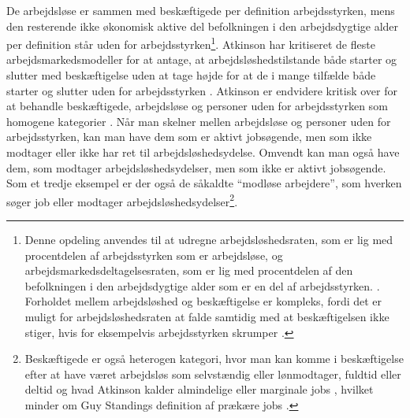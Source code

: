 De arbejdsløse er sammen med beskæftigede per definition arbejdsstyrken, mens den resterende ikke økonomisk aktive del  befolkningen i den arbejdsdygtige alder per definition står uden for arbejdsstyrken\footnote{Denne opdeling anvendes til at udregne arbejdsløshedsraten, som er lig med procentdelen af arbejdsstyrken som er arbejdsløse, og arbejdsmarkedsdeltagelsesraten, som er lig med procentdelen af den befolkningen i den arbejdsdygtige alder som er en del af arbejdsstyrken. \parencite[595]{Mankiw2011}. Forholdet mellem arbejdsløshed og beskæftigelse er kompleks, fordi det er muligt for arbejdsløshedsraten at falde samtidig med at beskæftigelsen ikke stiger, hvis for eksempelvis arbejdsstyrken skrumper \parencite[449]{Cahuc2004}.}. Atkinson har kritiseret de fleste arbejdsmarkedsmodeller for at antage, at arbejdsløshedstilstande både starter og slutter med beskæftigelse uden at tage højde for at de i mange tilfælde både starter og slutter uden for arbejdsstyrken \parencite[1683]{Atkinson1991}. Atkinson er endvidere kritisk over for at behandle beskæftigede, arbejdsløse og personer uden for arbejdsstyrken som homogene kategorier \parencite[1683]{Atkinson1991}. Når man skelner mellen arbejdsløse og personer uden for arbejdsstyrken, kan man have dem som er aktivt jobsøgende, men som ikke modtager eller ikke har ret til arbejdsløshedsydelse. Omvendt kan man også have dem, som modtager arbejdsløshedsydelser, men som ikke er aktivt jobsøgende. Som et tredje eksempel er der også de såkaldte “modløse arbejdere”, som hverken søger job eller modtager arbejdsløshedsydelser\footnote{Beskæftigede er også heterogen kategori, hvor man kan komme i beskæftigelse efter at have været arbejdsløs som selvstændig eller lønmodtager, fuldtid eller deltid og hvad Atkinson kalder almindelige eller marginale jobs \parencite[1685]{Atkinson1991}, hvilket minder om Guy Standings definition af prækære jobs \parencite[168]{Standing2011}.}. %

